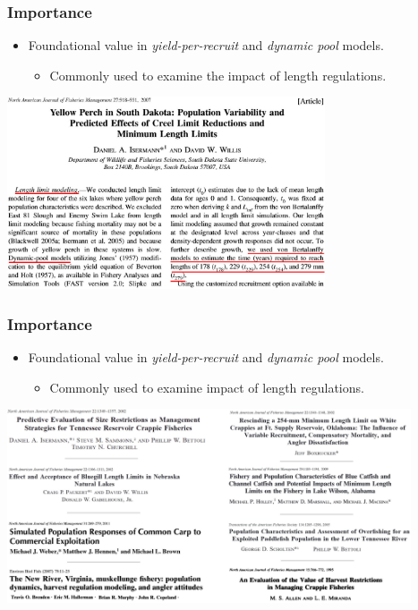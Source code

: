 \documentclass[xcolor=dvipsnames]{beamer}\usepackage[]{graphicx}\usepackage[]{color}
\begin{document}
\begin{frame}[fragile, t]
\frametitle{Importance}
\begin{itemize}
  \item Foundational value in \textit{yield-per-recruit} and \textit{dynamic pool} models.
  \begin{itemize}
    \item Commonly used to examine the impact of length regulations.
  \end{itemize}
\end{itemize}
\pause
\begin{center}
\includegraphics[width=3.7in]{Figs/Isermann-etal-2007.jpg}
\end{center}
\end{frame}


\begin{frame}[fragile, t]
\frametitle{Importance}
\begin{itemize}
  \item Foundational value in \textit{yield-per-recruit} and \textit{dynamic pool} models.
  \begin{itemize}
    \item Commonly used to examine impact of length regulations.
  \end{itemize}
\end{itemize}

\smallskip

\begin{center}
\includegraphics[width=4.7in]{Figs/tr-examples.jpg}
\end{center}
\end{frame}
\end{document}

